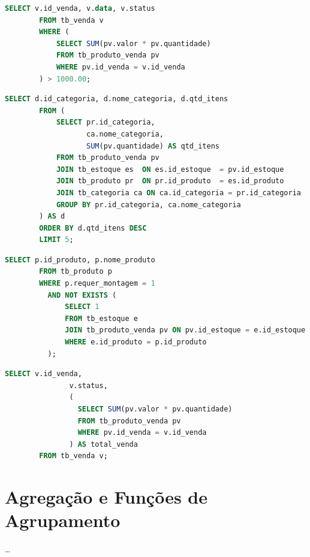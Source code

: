 \documentclass[
12pt,
a4paper,
semrecuonosumario,
sumario = abnt-6027-2012]{report}
\begin{document}
    \begin{lstlisting}[language=SQL,caption={SELECT -- Subconsulta correlata com agregação: vendas com total > 1000}]
        SELECT v.id_venda, v.data, v.status
        FROM tb_venda v
        WHERE (
            SELECT SUM(pv.valor * pv.quantidade)
            FROM tb_produto_venda pv
            WHERE pv.id_venda = v.id_venda
        ) > 1000.00;
    \end{lstlisting}

    \begin{lstlisting}[language=SQL,caption={SELECT -- Tabela derivada (FROM): top categorias por itens vendidos}]
        SELECT d.id_categoria, d.nome_categoria, d.qtd_itens
        FROM (
            SELECT pr.id_categoria,
                   ca.nome_categoria,
                   SUM(pv.quantidade) AS qtd_itens
            FROM tb_produto_venda pv
            JOIN tb_estoque es  ON es.id_estoque  = pv.id_estoque
            JOIN tb_produto pr  ON pr.id_produto  = es.id_produto
            JOIN tb_categoria ca ON ca.id_categoria = pr.id_categoria
            GROUP BY pr.id_categoria, ca.nome_categoria
        ) AS d
        ORDER BY d.qtd_itens DESC
        LIMIT 5;
    \end{lstlisting}

    \begin{lstlisting}[language=SQL,caption={SELECT -- NOT EXISTS (correlata): produtos que requerem montagem e nunca foram vendidos}]
        SELECT p.id_produto, p.nome_produto
        FROM tb_produto p
        WHERE p.requer_montagem = 1
          AND NOT EXISTS (
              SELECT 1
              FROM tb_estoque e
              JOIN tb_produto_venda pv ON pv.id_estoque = e.id_estoque
              WHERE e.id_produto = p.id_produto
          );
    \end{lstlisting}

    \begin{lstlisting}[language=SQL,caption={SELECT -- Subconsulta escalar em projeção: total (R\$) por venda}]
        SELECT v.id_venda,
               v.status,
               (
                 SELECT SUM(pv.valor * pv.quantidade)
                 FROM tb_produto_venda pv
                 WHERE pv.id_venda = v.id_venda
               ) AS total_venda
        FROM tb_venda v;
    \end{lstlisting}


    \section{Agregação e Funções de Agrupamento}
    \dots
\end{document}
